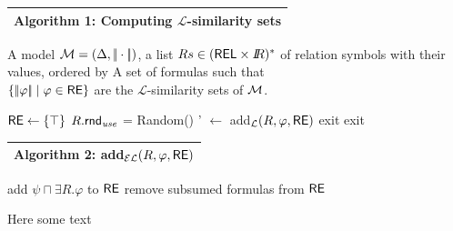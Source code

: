 \begin{multicols}{2}

\begin{tabular}{p{.95\linewidth}}\hline
\small \textbf{Algorithm 1:} Computing $\mathcal{L}$-similarity sets\\ \hline
\end{tabular}

\begin{algorithmic}
\small 

\Require A model $\mathcal{M} = (\Delta, |\!|\cdot|\!|)$, a list $Rs \in (\textsf{REL} \times I\!\!R)^*$
 of relation symbols with their \puse values, ordered by \puse
\Ensure A set of formulas \RE such that \\ $\{|\!|\varphi|\!| \mid \varphi \in \textsf{RE}\}$ are the
$\mathcal{L}$-similarity sets of $\mathcal{M}$.

\State
\State $\textsf{RE} \leftarrow \{\top\}$
  \State $R.\textsf{rnd}_\emph{use}$ = Random()
\EndFor
{}
  \State    \RE' $\leftarrow$ \RE 
        \For{$\varphi \in \RE$}
            \State add$_\mathcal{L}(R, \varphi, \textsf{RE})$
               \State exit
           \EndIf
        \EndFor
     \EndIf
   \EndFor
      \State exit
   \EndIf
\EndWhile
\end{algorithmic}

\begin{tabular}{p{.95\linewidth}}\hline
\small \textbf{Algorithm 2:} add$_{\mathcal{EL}}(R,\varphi,\textsf{RE})$\\ \hline
\end{tabular}

\begin{algorithmic}
      \State add $\psi \sqcap \exists R.\varphi$ to $\textsf{RE}$
      \State remove subsumed formulas from $\textsf{RE}$
  \EndIf
\EndFor
\end{algorithmic}
\end{multicols}

Here some text

